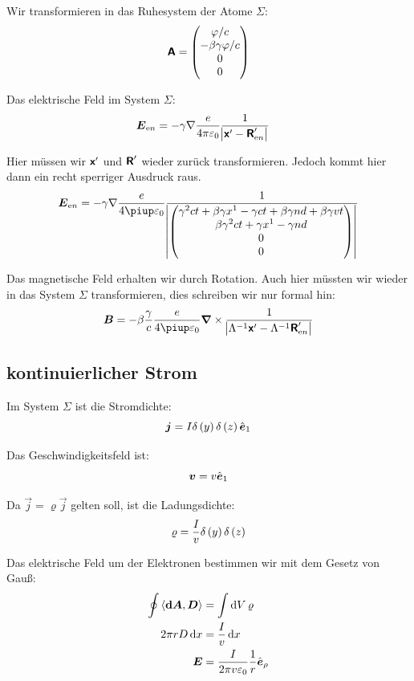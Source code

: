 Wir transformieren in das Ruhesystem der Atome $\Sigma$:
\[
	\boldsymbol{\mathsf{A}}
	=
	\begin{pmatrix}
		\varphi / c \\ - \beta \gamma \varphi / c \\ 0 \\ 0
	\end{pmatrix}
\]

Das elektrische Feld im System $\Sigma$:
\begin{align*}
	\boldsymbol{E}_{\text en}
	&= - \gamma \nabla \frac{e}{4 \pi \varepsilon_0}
	\frac{1}{\abs{\boldsymbol{\mathsf{x}}' - \boldsymbol{\mathsf{R}}'_{\text en}}}
\end{align*}

Hier müssen wir $\boldsymbol{\mathsf{x}}'$ und $\boldsymbol{\mathsf{R}}'$ wieder zurück transformieren. Jedoch
kommt hier dann ein recht sperriger Ausdruck raus.
\[
	\vec E_{\text en}
	=
	- \gamma \nabla \frac{e}{4 \piup \varepsilon_0} \frac{1}{
		\abs{
			\begin{pmatrix}
				\gamma^2 ct + \beta \gamma x^1 - \gamma ct + \beta \gamma nd + \beta\gamma vt \\
				\beta \gamma^2 ct + \gamma x^1 - \gamma nd \\
				0 \\
				0
			\end{pmatrix}
		}
	}
\]

Das magnetische Feld erhalten wir durch Rotation. Auch hier müssten wir wieder
in das System $\Sigma$ transformieren, dies schreiben wir nur formal hin:
\[
	\vec B = - \beta \frac \gamma c \frac{e}{4\piup\varepsilon_0} \curl 
	\frac{1}{\abs{\Lambda^{-1} \tens x' - \Lambda^{-1} \tens R'_{\text en}}}
\]

\subsection{kontinuierlicher Strom}

Im System $\Sigma$ ist die Stromdichte:
\[
	\vec j = I \delta\del y \delta\del z \ev_1
\]

Das Geschwindigkeitsfeld ist:
\[
	\boldsymbol{v} = v \hat{\boldsymbol{e}}_1
\]

Da $\vec j = \varrho \vec j$ gelten soll, ist die Ladungsdichte:
\[
	\varrho = \frac Iv \delta\del y \delta\del z
\]

Das elektrische Feld um der Elektronen bestimmen wir mit dem Gesetz von Gauß:
\begin{align*}
	\oint \inner{\vec{\dif A}}{\vec D}
	&=
	\int \dif V \, \varrho \\
	2 \pi r D \dif x &= \frac Iv \dif x \\
	\vec E &= \frac{I}{2\pi v \varepsilon_0} \frac 1r \ev_\rho
\end{align*}

